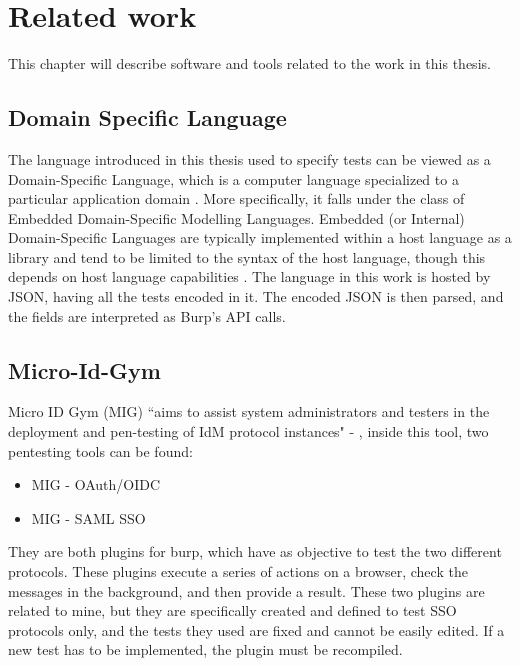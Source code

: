 \chapter{Related work}
\label{chap:Related_work}
This chapter will describe software and tools related to the work in this thesis.

\section{Domain Specific Language}
The language introduced in this thesis used to specify tests can be viewed as a Domain-Specific Language, which is a computer language specialized to a particular application domain \cite{wikipedia_dsl}. More specifically, it falls under the class of Embedded Domain-Specific Modelling Languages. Embedded (or Internal) Domain-Specific Languages are typically implemented within a host language as a library and tend to be limited to the syntax of the host language, though this depends on host language capabilities \cite{wikipedia_dsl}. The language in this work is hosted by JSON, having all the tests encoded in it. The encoded JSON is then parsed, and the fields are interpreted as Burp's API calls.

\section{Micro-Id-Gym}
\label{sec:micro-id-gym}
Micro ID Gym (MIG) ``aims to assist system administrators and testers in the deployment and pen-testing of IdM protocol instances" - \cite{micro_id_gym}, inside this tool, two pentesting tools can be found:
\begin{itemize}
    \item MIG - OAuth/OIDC \cite{claudio_grisenti}
    \item MIG - SAML SSO \cite{stefano_facchini}
\end{itemize}
They are both plugins for \Gls{burp}, which have as objective to test the two different protocols. These plugins execute a series of actions on a browser, check the messages in the background, and then provide a result.
These two plugins are related to mine, but they are specifically created and defined to test SSO protocols only, and the tests they used are fixed and cannot be easily edited. If a new test has to be implemented, the plugin must be recompiled.

